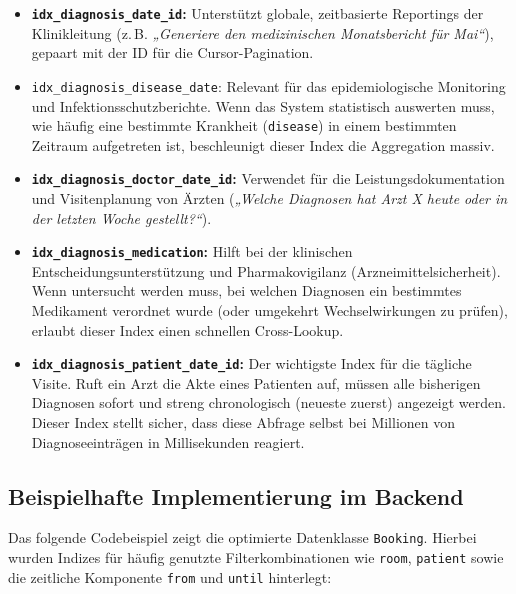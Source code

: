 \begin{itemize}
    \item \textbf{\texttt{idx\_diagnosis\_date\_id}:} Unterstützt globale, zeitbasierte Reportings der Klinikleitung (z.\,B. \textit{„Generiere den medizinischen Monatsbericht für Mai“}), gepaart mit der ID für die Cursor-Pagination.
    \item \texttt{idx\_diagnosis\_disease\_date}: Relevant für das epidemiologische Monitoring und Infektionsschutzberichte. Wenn das System statistisch auswerten muss, wie häufig eine bestimmte Krankheit (\texttt{disease}) in einem bestimmten Zeitraum aufgetreten ist, beschleunigt dieser Index die Aggregation massiv.
    \item \textbf{\texttt{idx\_diagnosis\_doctor\_date\_id}:} Verwendet für die Leistungsdokumentation und Visitenplanung von Ärzten (\textit{„Welche Diagnosen hat Arzt X heute oder in der letzten Woche gestellt?“}).
    \item \textbf{\texttt{idx\_diagnosis\_medication}:} Hilft bei der klinischen Entscheidungsunterstützung und Pharmakovigilanz (Arzneimittelsicherheit). Wenn untersucht werden muss, bei welchen Diagnosen ein bestimmtes Medikament verordnet wurde (oder umgekehrt Wechselwirkungen zu prüfen), erlaubt dieser Index einen schnellen Cross-Lookup.
    \item \textbf{\texttt{idx\_diagnosis\_patient\_date\_id}:} Der wichtigste Index für die tägliche Visite. Ruft ein Arzt die Akte eines Patienten auf, müssen alle bisherigen Diagnosen sofort und streng chronologisch (neueste zuerst) angezeigt werden. Dieser Index stellt sicher, dass diese Abfrage selbst bei Millionen von Diagnoseeinträgen in Millisekunden reagiert.
\end{itemize}


\subsection{Beispielhafte Implementierung im Backend}
Das folgende Codebeispiel zeigt die optimierte Datenklasse \texttt{Booking}. Hierbei wurden Indizes für häufig genutzte Filterkombinationen wie \texttt{room}, \texttt{patient} sowie die zeitliche Komponente \texttt{from} und \texttt{until} hinterlegt:

